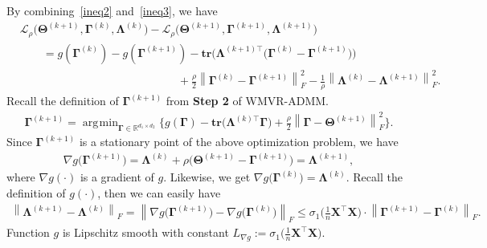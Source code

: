 \documentclass[alpha-refs]{wiley-article}
\DeclareMathOperator*{\argmin}{\arg\!\min}
\begin{document}
By combining~\eqref{ineq2} and~\eqref{ineq3}, we have
\begin{align} \label{ineq4}
    &\mathcal{L}_{\rho} \big( \boldsymbol{\Theta}^{(k+1)},\boldsymbol{\Gamma}^{(k)},\boldsymbol{\Lambda}^{(k)} \big)
    - \mathcal{L}_{\rho} \big( \boldsymbol{\Theta}^{(k+1)},\boldsymbol{\Gamma}^{(k+1)},\boldsymbol{\Lambda}^{(k+1)} \big) \nonumber \\
    &\qquad = g(\boldsymbol{\Gamma}^{(k)})-g(\boldsymbol{\Gamma}^{(k+1)}) - \textbf{tr}\big( \boldsymbol{\Lambda}^{(k+1)\top}\big(\boldsymbol{\Gamma}^{(k)}-\boldsymbol{\Gamma}^{(k+1)}\big)\big) \nonumber \\
    &\qquad \qquad \qquad \qquad \qquad \qquad \qquad
    + \frac{\rho}{2}\left\| \boldsymbol{\Gamma}^{(k)}-\boldsymbol{\Gamma}^{(k+1)} \right\|_{F}^{2} -\frac{1}{\rho}\left\| \boldsymbol{\Lambda}^{(k)}-\boldsymbol{\Lambda}^{(k+1)} \right\|_{F}^{2}.
\end{align}
Recall the definition of $\boldsymbol{\Gamma}^{(k+1)}$ from \textbf{Step 2} of WMVR-ADMM.
\begin{align*}
    \boldsymbol{\Gamma}^{(k+1)} = \argmin_{\boldsymbol{\Gamma} \in \mathbb{R}^{d_{1} \times d_{2}}}
    \bigg\{ g(\boldsymbol{\Gamma}) - \textbf{tr}\big(\boldsymbol{\Lambda}^{(k)\top}\boldsymbol{\Gamma}\big)+\frac{\rho}{2}\left\|\boldsymbol{\Gamma}-\boldsymbol{\Theta}^{(k+1)} \right\|_{F}^{2} \bigg\}.
\end{align*}
Since $\boldsymbol{\Gamma}^{(k+1)}$ is a stationary point of the above optimization problem, we have
\begin{align*}
    \nabla g\big( \boldsymbol{\Gamma}^{(k+1)} \big)
    = \boldsymbol{\Lambda}^{(k)} + \rho\big( \boldsymbol{\Theta}^{(k+1)}-\boldsymbol{\Gamma}^{(k+1)} \big)
    = \boldsymbol{\Lambda}^{(k+1)},
\end{align*}
where $\nabla g (\cdot)$ is a gradient of $g$.
Likewise, we get $\nabla g\big( \boldsymbol{\Gamma}^{(k)} \big) = \boldsymbol{\Lambda}^{(k)}$.
Recall the definition of $g(\cdot)$, then we can easily have
\begin{align} \label{ineq5}
    \left\|\boldsymbol{\Lambda}^{(k+1)}-\boldsymbol{\Lambda}^{(k)}\right\|_{F} =
    \left\|\nabla g\big( \boldsymbol{\Gamma}^{(k+1)} \big)
    - \nabla g\big( \boldsymbol{\Gamma}^{(k)} \big)\right\|_{F}
    \leq \sigma_{1}\bigg( \frac{1}{n}\boldsymbol{X}^{\top}\boldsymbol{X}\bigg)
    \cdot
    \left\| \boldsymbol{\Gamma}^{(k+1)} - \boldsymbol{\Gamma}^{(k)} \right\|_{F}.
\end{align}
Function $g$ is Lipschitz smooth with constant $L_{\nabla g}:=\sigma_{1}\bigg( \frac{1}{n}\boldsymbol{X}^{\top}\boldsymbol{X}\bigg)$.
\end{document}

